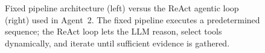 \begin{figure}[ht]
\caption{Fixed pipeline architecture (left) versus the ReAct agentic loop
         (right) used in Agent~2. The fixed pipeline executes a predetermined
         sequence; the ReAct loop lets the LLM reason, select tools
         dynamically, and iterate until sufficient evidence is gathered.}
\label{fig:pipeline_vs_react}
\end{figure}
